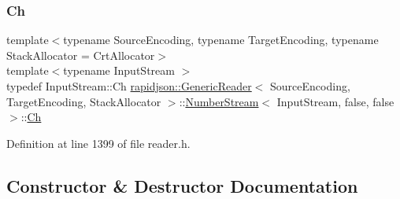 \subsubsection{\texorpdfstring{Ch}{Ch}}
{\footnotesize\ttfamily template$<$typename Source\+Encoding, typename Target\+Encoding, typename Stack\+Allocator = Crt\+Allocator$>$ \\
template$<$typename Input\+Stream $>$ \\
typedef Input\+Stream\+::\+Ch \mbox{\hyperlink{classrapidjson_1_1_generic_reader}{rapidjson\+::\+Generic\+Reader}}$<$ Source\+Encoding, Target\+Encoding, Stack\+Allocator $>$\+::\mbox{\hyperlink{classrapidjson_1_1_generic_reader_1_1_number_stream}{Number\+Stream}}$<$ Input\+Stream, false, false $>$\+::\mbox{\hyperlink{classrapidjson_1_1_generic_reader_1_1_number_stream_3_01_input_stream_00_01false_00_01false_01_4_a2a945ef08d04099027c32f72821a12c0}{Ch}}}



Definition at line 1399 of file reader.\+h.



\subsection{Constructor \& Destructor Documentation}
\mbox{\label{classrapidjson_1_1_generic_reader_1_1_number_stream_3_01_input_stream_00_01false_00_01false_01_4_a7ff325d27585f83566198c0b3f1a008e}} 

